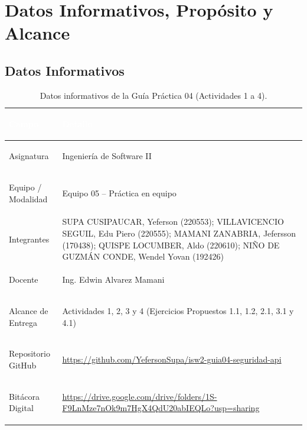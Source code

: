 \documentclass[12pt,a4paper]{article}
\begin{document}
\tableofcontents
\newpage

\section{Datos Informativos, Propósito y Alcance}

\subsection{Datos Informativos}
\begin{table}[H]
\centering
\caption{Datos informativos de la Guía Práctica 04 (Actividades 1 a 4).}
\label{tab:datos_informativos}
\begin{tabularx}{\textwidth}{>{\bfseries\raggedright\arraybackslash}p{4.2cm} >{\raggedright\arraybackslash}X}
\hline
\rowcolor{unsaacMaroon} \textcolor{white}{Campo} & \textcolor{white}{Detalle} \\
\hline
Asignatura & Ingeniería de Software II \\
\rowcolor{rowAlt} Equipo / Modalidad & Equipo 05 -- Práctica en equipo \\
Integrantes & SUPA CUSIPAUCAR, Yeferson (220553); VILLAVICENCIO SEGUIL, Edu Piero (220555); MAMANI ZANABRIA, Jefersson (170438); QUISPE LOCUMBER, Aldo (220610); NIÑO DE GUZMÁN CONDE, Wendel Yovan (192426) \\
\rowcolor{rowAlt} Docente & Ing. Edwin Alvarez Mamani \\
Alcance de Entrega & Actividades 1, 2, 3 y 4 (Ejercicios Propuestos 1.1, 1.2, 2.1, 3.1 y 4.1) \\
\rowcolor{rowAlt} Repositorio GitHub & \url{https://github.com/YefersonSupa/isw2-guia04-seguridad-api} \\
\rowcolor{rowAlt} Bitácora Digital & \url{https://drive.google.com/drive/folders/1S-F9LnMze7nOk9m7HgX4QdU20abIEQLo?usp=sharing} \\
\hline
\end{tabularx}
\end{table}
\end{document}

